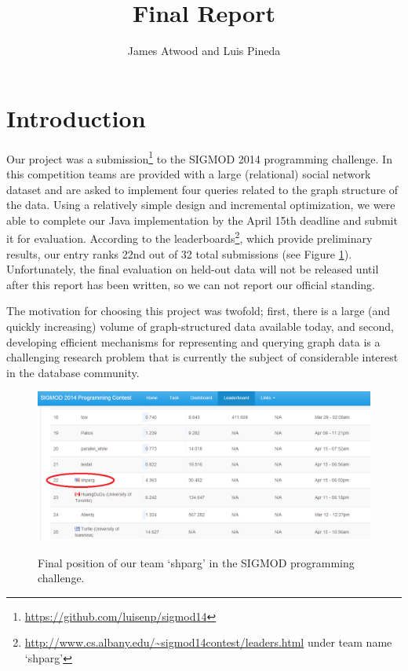 \documentclass{article}
\title{Final Report}
\author{
James Atwood and Luis Pineda \\ %
}
\begin{document}
\maketitle

\section{Introduction}
Our project was a
submission\footnote{\url{https://github.com/luisenp/sigmod14}} to the
SIGMOD 2014 programming challenge.  In this competition teams are
provided with a large (relational) social network dataset and are
asked to implement four queries related to the graph structure of the
data.  Using a relatively simple design and incremental optimization,
we were able to complete our Java implementation by the April 15th
deadline and submit it for evaluation.  According to the
leaderboards\footnote{\url{http://www.cs.albany.edu/~sigmod14contest/leaders.html}
  under team name `shparg'}, which provide preliminary results, our
entry ranks 22nd out of 32 total submissions (see Figure
\ref{fig:leader}).  Unfortunately, the final evaluation on held-out
data will not be released until after this report has been written, so
we can not report our official standing.

The motivation for choosing this project was
twofold; first, there is a large (and quickly increasing) volume of
graph-structured data available today, and second, developing
efficient mechanisms for representing and querying graph data is a
challenging research problem that is currently the subject of
considerable interest in the database community.

\begin{figure}[t]
  \centering
  \includegraphics[scale=0.45]{img/leaderboard.png}
  \label{fig:leader}
  \caption{Final position of our team `shparg' in the SIGMOD programming challenge.}
\end{figure}
\end{document}
